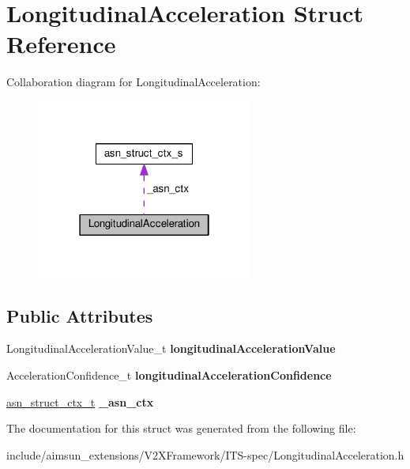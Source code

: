 \hypertarget{structLongitudinalAcceleration}{}\section{Longitudinal\+Acceleration Struct Reference}
\label{structLongitudinalAcceleration}


Collaboration diagram for Longitudinal\+Acceleration\+:\nopagebreak
\begin{figure}[H]
\begin{center}
\leavevmode
\includegraphics[width=202pt]{structLongitudinalAcceleration__coll__graph}
\end{center}
\end{figure}
\subsection*{Public Attributes}
\begin{DoxyCompactItemize}
\item 
Longitudinal\+Acceleration\+Value\+\_\+t {\bfseries longitudinal\+Acceleration\+Value}\hypertarget{structLongitudinalAcceleration_abb13e3c3bebf26125083229942ca91c8}{}\label{structLongitudinalAcceleration_abb13e3c3bebf26125083229942ca91c8}

\item 
Acceleration\+Confidence\+\_\+t {\bfseries longitudinal\+Acceleration\+Confidence}\hypertarget{structLongitudinalAcceleration_a7b5ea4a17650bb1d5a66e9ad5b0c9057}{}\label{structLongitudinalAcceleration_a7b5ea4a17650bb1d5a66e9ad5b0c9057}

\item 
\hyperlink{structasn__struct__ctx__s}{asn\+\_\+struct\+\_\+ctx\+\_\+t} {\bfseries \+\_\+asn\+\_\+ctx}\hypertarget{structLongitudinalAcceleration_abfa1070064961deb4ac2082f95dfd3d4}{}\label{structLongitudinalAcceleration_abfa1070064961deb4ac2082f95dfd3d4}

\end{DoxyCompactItemize}


The documentation for this struct was generated from the following file\+:\begin{DoxyCompactItemize}
\item 
include/aimsun\+\_\+extensions/\+V2\+X\+Framework/\+I\+T\+S-\/spec/Longitudinal\+Acceleration.\+h\end{DoxyCompactItemize}
